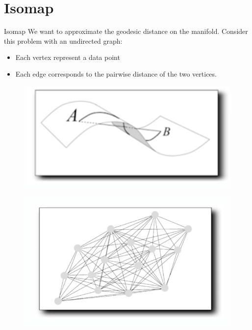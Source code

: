 \documentclass[xcolor={dvipsnames,table}]{beamer}
\begin{document}
\section{Isomap}
\begin{frame}{Isomap}
	We want to approximate the geodesic distance on the manifold. Consider this problem with an undirected graph:
	\begin{itemize}
	 	\item Each vertex represent a data point
	 	\item Each edge corresponds to the pairwise distance of the two vertices.
	 \end{itemize}
	\begin{figure}
    \begin{minipage}{0.499\linewidth}{
            \centering
                \includegraphics[width=\linewidth]{isoexplain0.png}%
        }
    \end{minipage}%
    \begin{minipage}{0.499\linewidth}{
            \centering
            \includegraphics[width=\linewidth]{isoexplain1.png}
        }
    \end{minipage}
\end{figure}
	
\end{frame}
\end{document}
